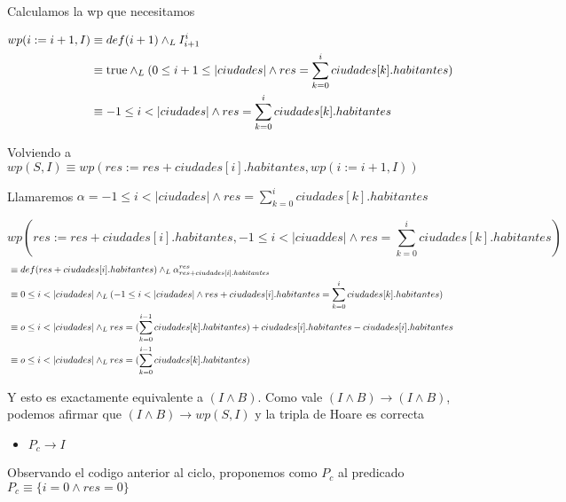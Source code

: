 \documentclass[10pt,a4paper]{article}
\begin{document}
\begin {enumerate}
    Calculamos la wp que necesitamos

    \begin{align*}
        wp (i := i + 1, I) &\equiv def(i + 1) \land _L I_{i +1}^{i} \\
        &\equiv \mathrm{true} \land _L (0 \leq i + 1 \leq |ciudades| \land res = \sum\limits_{k=0}^{i}{ciudades[k].habitantes}) \\
        &\equiv -1 \leq i < |ciudades| \land res =  \sum\limits_{k=0}^{i}{ciudades[k].habitantes} 
    \end{align*}

    Volviendo a $wp(S, I) \equiv wp(res := res + ciudades[i].habitantes, wp(i := i + 1, I))$

    Llamaremos $\alpha = -1 \leq i < |ciudades| \land res =  \sum\limits_{k=0}^{i}{ciudades[k].habitantes} $

    $$ wp(res := res + ciudades[i].habitantes, -1 \leq i < |ciuaddes| \land res =  \sum\limits_{k=0}^{i}{ciudades[k].habitantes}) $$
    \begin{align*}
        &\equiv def(res + ciudades[i].habitantes) \land _L \alpha_{res + ciudades[i].habitantes}^{res} \\
        &\equiv 0 \leq i < |ciudades| \land _L (-1 \leq i < |ciudades| \land res + ciudades[i].habitantes = \sum\limits_{k=0}^{i}{ciudades[k].habitantes} ) \\
        &\equiv o \leq i < |ciudades| \land _L res = (\sum\limits_{k=0}^{i - 1}{ciudades[k].habitantes}) + ciudades[i].habitantes - ciudades[i].habitantes \\
        &\equiv o \leq i < |ciudades| \land _L res = (\sum\limits_{k=0}^{i - 1}{ciudades[k].habitantes})  \\
    \end{align*}

    Y esto es exactamente equivalente a $(I \land B)$. Como vale $(I \land B) \to (I \land B)$, podemos afirmar que $(I \land B) \to wp(S, I)$ y la tripla de Hoare es correcta


    \begin{itemize}
        \item $ P_{c} \to I$
        \end{itemize}

    Observando el codigo anterior al ciclo, proponemos como $P_{c}$ al predicado $P_{c} \equiv \{i = 0 \land res = 0\}$


\end{enumerate}
\end{document}
